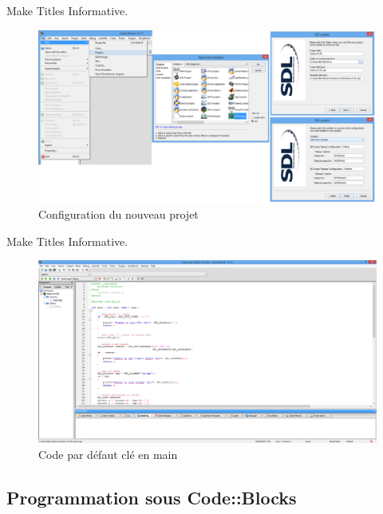 \documentclass{beamer}
\begin{document}
\begin{frame}{Make Titles Informative.}
\begin{figure}
\includegraphics[scale=0.35]{../images/cb02.png}
\caption{Configuration du nouveau projet}				
\label{cb02}				
\end{figure}
\end{frame}

\begin{frame}{Make Titles Informative.}
\begin{figure}
\includegraphics[scale=0.35]{../images/cb03.png}
\caption{Code par défaut clé en main}				
\label{cb03}				
\end{figure}
\end{frame}


\subsection{Programmation sous Code::Blocks}
\end{document}
